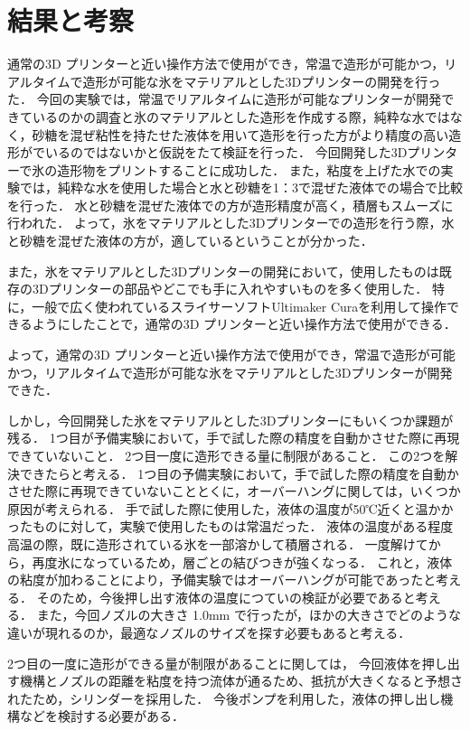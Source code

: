 \chapter{結果と考察}
\label{chp:first}

通常の3D プリンターと近い操作方法で使用ができ，常温で造形が可能かつ，リアルタイムで造形が可能な氷をマテリアルとした3Dプリンターの開発を行った．
今回の実験では，常温でリアルタイムに造形が可能なプリンターが開発できているのかの調査と氷のマテリアルとした造形を作成する際，純粋な水ではなく，砂糖を混ぜ粘性を持たせた液体を用いて造形を行った方がより精度の高い造形がでいるのではないかと仮説をたて検証を行った．
今回開発した3Dプリンターで氷の造形物をプリントすることに成功した．
また，粘度を上げた水での実験では，純粋な水を使用した場合と水と砂糖を1：3で混ぜた液体での場合で比較を行った．
水と砂糖を混ぜた液体での方が造形精度が高く，積層もスムーズに行われた．
よって，氷をマテリアルとした3Dプリンターでの造形を行う際，水と砂糖を混ぜた液体の方が，適しているということが分かった．

また，氷をマテリアルとした3Dプリンターの開発において，使用したものは既存の3Dプリンターの部品やどこでも手に入れやすいものを多く使用した．
特に，一般で広く使われているスライサーソフトUltimaker Curaを利用して操作できるようにしたことで，通常の3D プリンターと近い操作方法で使用ができる．

よって，通常の3D プリンターと近い操作方法で使用ができ，常温で造形が可能かつ，リアルタイムで造形が可能な氷をマテリアルとした3Dプリンターが開発できた．

しかし，今回開発した氷をマテリアルとした3Dプリンターにもいくつか課題が残る．
1つ目が予備実験において，手で試した際の精度を自動かさせた際に再現できていないこと．
2つ目一度に造形できる量に制限があること．
この2つを解決できたらと考える．
1つ目の予備実験において，手で試した際の精度を自動かさせた際に再現できていないこととくに，オーバーハングに関しては，いくつか原因が考えられる．
手で試した際に使用した，液体の温度が50℃近くと温かかったものに対して，実験で使用したものは常温だった．
液体の温度がある程度高温の際，既に造形されている氷を一部溶かして積層される．
一度解けてから，再度氷になっているため，層ごとの結びつきが強くなっる．
これと，液体の粘度が加わることにより，予備実験ではオーバーハングが可能であったと考える．
そのため，今後押し出す液体の温度につていの検証が必要であると考える．
また，今回ノズルの大きさ 1.0mm で行ったが，ほかの大きさでどのような違いが現れるのか，最適なノズルのサイズを探す必要もあると考える．

2つ目の一度に造形ができる量が制限があることに関しては，
今回液体を押し出す機構とノズルの距離を粘度を持つ流体が通るため、抵抗が大きくなると予想されたため，シリンダーを採用した．
今後ポンプを利用した，液体の押し出し機構などを検討する必要がある．


